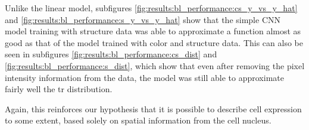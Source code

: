 Unlike the linear model, subfigures \ref{fig:results:bl_performance:cs_y_vs_y_hat} and \ref{fig:results:bl_performance:s_y_vs_y_hat} show that the simple CNN model training with structure data was able to approximate a function almost as good as that of the model trained with color and structure data.
This can also be seen in subfigures \ref{fig:results:bl_performance:cs_dist} and \ref{fig:results:bl_performance:s_dist}, which show that even after removing the pixel intensity information from the data, the model was still able to approximate fairly well the \gls{tr} distribution.

Again, this reinforces our hypothesis that it is possible to describe cell expression to some extent, based solely on spatial information from the cell nucleus.
